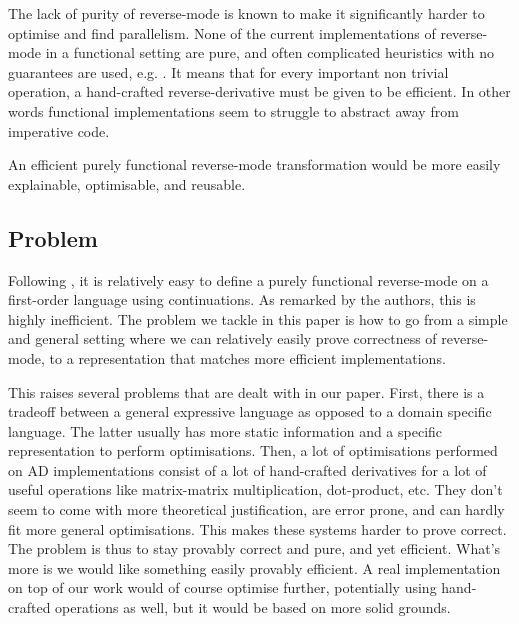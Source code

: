 The lack of purity of reverse-mode is known to make it significantly harder to optimise and find parallelism. 
None of the current implementations of reverse-mode in a functional setting \cite{lantern_icfp,pearlmutter2008reverse,baydin2016diffsharp} are pure, and often complicated heuristics with no guarantees are used, e.g. \cite{xla}.
It means that for every important non trivial operation, a hand-crafted reverse-derivative must be given to be efficient.
In other words functional implementations seem to struggle to abstract away from imperative code.

 An efficient purely functional reverse-mode transformation would be more easily explainable, optimisable, and reusable.

 \subsection{Problem}

Following \cite{pearlmutter2008reverse}, it is relatively easy to define a purely functional reverse-mode on a first-order language using continuations. 
As remarked by the authors, this is highly inefficient. 
The problem we tackle in this paper is how to go from a simple and general setting where we can relatively easily prove correctness of reverse-mode, 
to a representation that matches more efficient implementations.

This raises several problems that are dealt with in our paper. First, there is a tradeoff between a general expressive language 
as opposed to a domain specific language. The latter usually has more static information and a specific representation to perform optimisations.
Then, a lot of optimisations performed on AD implementations consist of a lot of hand-crafted derivatives for a lot of useful operations like matrix-matrix multiplication, dot-product, etc.
They don't seem to come with more theoretical justification, are error prone, and can hardly fit more general optimisations.
This makes these systems harder to prove correct. The problem is thus to stay provably correct and pure, and yet efficient. What's more is we would like something easily provably efficient. 
A real implementation on top of our work would of course optimise further, potentially using hand-crafted operations as well, but it would be based on more solid grounds.

